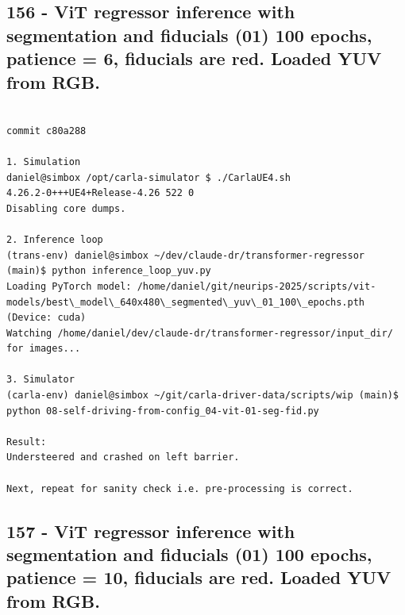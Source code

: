 \subsection{156 - ViT regressor inference with segmentation and fiducials (01) 100 epochs, patience = 6, fiducials are red. Loaded YUV from RGB.}
\label{app_res:156}

\begin{verbatim}

commit c80a288

1. Simulation
daniel@simbox /opt/carla-simulator $ ./CarlaUE4.sh 
4.26.2-0+++UE4+Release-4.26 522 0
Disabling core dumps.

2. Inference loop
(trans-env) daniel@simbox ~/dev/claude-dr/transformer-regressor (main)$ python inference_loop_yuv.py 
Loading PyTorch model: /home/daniel/git/neurips-2025/scripts/vit-models/best\_model\_640x480\_segmented\_yuv\_01_100\_epochs.pth (Device: cuda)
Watching /home/daniel/dev/claude-dr/transformer-regressor/input_dir/ for images...

3. Simulator
(carla-env) daniel@simbox ~/git/carla-driver-data/scripts/wip (main)$ python 08-self-driving-from-config_04-vit-01-seg-fid.py 

Result:
Understeered and crashed on left barrier.

Next, repeat for sanity check i.e. pre-processing is correct.

\end{verbatim}

\subsection{157 - ViT regressor inference with segmentation and fiducials (01) 100 epochs, patience = 10, fiducials are red. Loaded YUV from RGB.}
\label{app_res:157}


